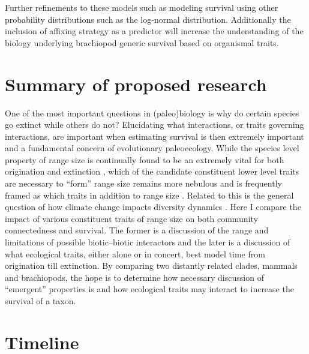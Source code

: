 \documentclass[12pt,letterpaper]{article}
\begin{document}
Further refinements to these models such as modeling survival using other probability distributions such as the log-normal distribution. Additionally the inclusion of affixing strategy as a predictor will increase the understanding of the biology underlying brachiopod generic survival based on organismal traits.

\section{Summary of proposed research}
One of the most important questions in (paleo)biology is why do certain species go extinct while others do not? %
Elucidating what interactions, or traits governing interactions, are important when estimating survival is then extremely important and a fundamental concern of evolutionary paleoecology. While the species level property of range size is continually found to be an extremely vital for both origination and extinction \citep{Roy2009c,Foote2013,Jablonski2003,Jablonski1987,Harnik2013}, which of the candidate constituent lower level traits are necessary to ``form'' range size remains more nebulous and is frequently framed as which traits in addition to range size \citep{Foote2013,Harnik2011,Nurnberg2013a}. Related to this is the general question of how climate change impacts diversity dynamics \citep{Barnosky2001a,Alroy2000g,Figueirido2012,Olszewski2004}.
Here I compare the impact of various constituent traits of range size on both community connectedness and survival. The former is a discussion of the range and limitations of possible biotic--biotic interactors and the later is a discussion of what ecological traits, either alone or in concert, best model time from origination till extinction. By comparing two distantly related clades, mammals and brachiopods, the hope is to determine how necessary discussion of ``emergent'' properties is and how ecological traits may interact to increase the survival of a taxon.


\clearpage
\section{Timeline}
\end{document}
